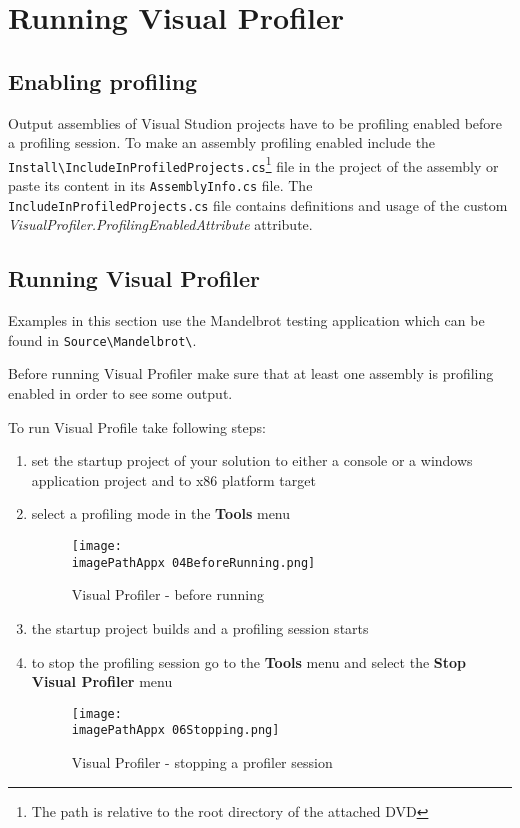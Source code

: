 \chapter{Running Visual Profiler}

\section{Enabling profiling}
Output assemblies of Visual Studion projects have to be profiling enabled before a profiling session. To make an assembly profiling enabled include the \linebreak\texttt{Install\textbackslash IncludeInProfiledProjects.cs}\footnote{The path is relative to the root directory of the attached DVD} file in the project of the assembly or paste its content in its \texttt{AssemblyInfo.cs} file. The \texttt{IncludeInProfiledProjects.cs} file contains definitions and usage of the custom \emph{VisualProfiler.ProfilingEnabledAttribute} attribute.

\section{Running Visual Profiler}
Examples in this section use the Mandelbrot testing application which can be found in \texttt{Source\textbackslash Mandelbrot\textbackslash}\footnotemark[\value{footnote}].

Before running Visual Profiler make sure that at least one assembly is profiling enabled in order to see some output.

To run Visual Profile take following steps:
\begin{enumerate}
\item set the startup project of your solution to either a console or a windows application project and to x86 platform target

\item select a profiling mode in the \textbf{Tools} menu

\begin{figure}[H]
	\centering
		\texttt{[image: \\imagePathAppx 04BeforeRunning.png]}
		\caption{Visual Profiler - before running}
	\label{fig:0904BeforeRunning}
\end{figure}

\item the startup project builds and a profiling session starts

\item to stop the profiling session go to the \textbf{Tools} menu and select the \textbf{Stop Visual Profiler} menu

\begin{figure}[H]
	\centering
		\texttt{[image: \\imagePathAppx 06Stopping.png]}
		\caption{Visual Profiler - stopping a profiler session}
	\label{fig:0906Stopping}
\end{figure}

\end{enumerate}


